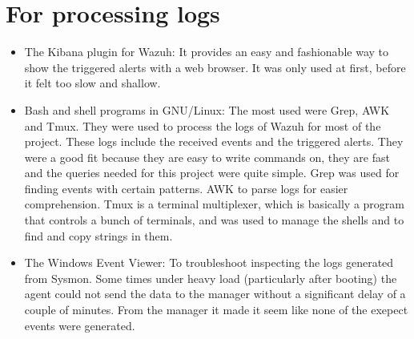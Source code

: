 \section{For processing logs}
\begin{itemize}
	\item The Kibana plugin for Wazuh: It provides an easy and fashionable way to show the triggered alerts with a web browser. It was only used at first, before it felt too slow and shallow.
	\item Bash and shell programs in GNU/Linux: The most used were Grep, AWK and Tmux. They were used to process the logs of Wazuh for most of the project. These logs include the received events and the triggered alerts. They were a good fit because they are easy to write commands on, they are fast and the queries needed for this project were quite simple. Grep was used for finding events with certain patterns. AWK to parse logs for easier comprehension. Tmux is a terminal multiplexer, which is basically a program that controls a bunch of terminals, and was used to manage the shells and to find and copy strings in them.
	\item The Windows Event Viewer: To troubleshoot inspecting the logs generated from Sysmon. Some times under heavy load (particularly after booting) the agent could not send the data to the manager without a significant delay of a couple of minutes. From the manager it made it seem like none of the exepect events were generated.
\end{itemize}

